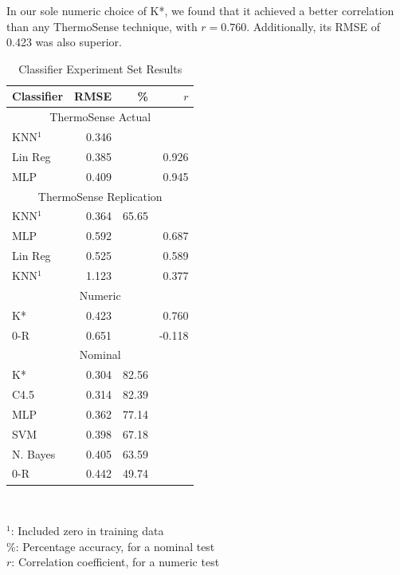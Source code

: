 \documentclass[../thesis/thesis.tex]{subfiles}
\begin{document}
In our sole numeric choice of K*, we found that it achieved a better correlation than any ThermoSense technique, with $r = 0.760$. Additionally, its RMSE of 0.423 was also superior.

\begin{table}
\centering
\begin{tabular}{|l|r|r|r|}
\hline
\textbf{Classifier} & \textbf{RMSE} & \textbf{\%} & \textbf{$r$} \\ \hline
\multicolumn{4}{|c|}{ThermoSense Actual}                         \\ \hline
KNN$^1$             & 0.346         &             &              \\ \hline
Lin Reg             & 0.385         &             & 0.926        \\ \hline
MLP                 & 0.409         &             & 0.945        \\ \hline
\multicolumn{4}{|c|}{ThermoSense Replication}                    \\ \hline
KNN$^1$             & 0.364         & 65.65       &              \\ \hline
MLP                 & 0.592         &             & 0.687        \\ \hline
Lin Reg             & 0.525         &             & 0.589        \\ \hline
KNN$^1$             & 1.123         &             & 0.377        \\ \hline
\multicolumn{4}{|c|}{Numeric}                                    \\ \hline
K*                  & 0.423         &             & 0.760        \\ \hline
0-R                 & 0.651         &             & -0.118       \\ \hline
\multicolumn{4}{|c|}{Nominal}                                    \\ \hline
K*                  & 0.304         & 82.56       &              \\ \hline
C4.5                & 0.314         & 82.39       &              \\ \hline
MLP                 & 0.362         & 77.14       &              \\ \hline
SVM                 & 0.398         & 67.18       &              \\ \hline
N. Bayes            & 0.405         & 63.59       &              \\ \hline
0-R                 & 0.442         & 49.74       &              \\ \hline
\end{tabular}\\
\parbox{220pt}{
$^1$: Included zero in training data \\
\%: Percentage accuracy, for a nominal test \\
$r$: Correlation coefficient, for a numeric test \\
}
\caption{Classifier Experiment Set Results}
\label{tab:results:set1}
\end{table}
\end{document}
